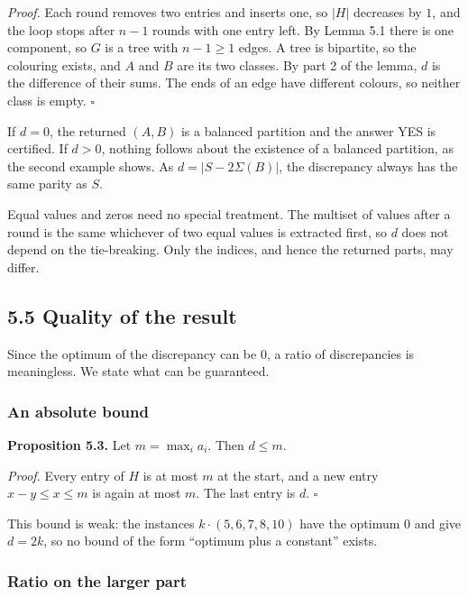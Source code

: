 \documentclass[
]{article}
\begin{document}
\emph{Proof.} Each round removes two entries and inserts one, so \(|H|\)
decreases by \(1\), and the loop stops after \(n - 1\) rounds with one
entry left. By Lemma 5.1 there is one component, so \(G\) is a tree with
\(n - 1 \ge 1\) edges. A tree is bipartite, so the colouring exists, and
\(A\) and \(B\) are its two classes. By part 2 of the lemma, \(d\) is
the difference of their sums. The ends of an edge have different
colours, so neither class is empty. \(\square\)

If \(d = 0\), the returned \((A, B)\) is a balanced partition and the
answer YES is certified. If \(d > 0\), nothing follows about the
existence of a balanced partition, as the second example shows. As
\(d = |S - 2\Sigma(B)|\), the discrepancy always has the same parity as
\(S\).

Equal values and zeros need no special treatment. The multiset of values
after a round is the same whichever of two equal values is extracted
first, so \(d\) does not depend on the tie-breaking. Only the indices,
and hence the returned parts, may differ.

\hypertarget{quality-of-the-result}{%
\subsection{5.5 Quality of the result}\label{quality-of-the-result}}

Since the optimum of the discrepancy can be \(0\), a ratio of
discrepancies is meaningless. We state what can be guaranteed.

\hypertarget{an-absolute-bound}{%
\subsubsection{An absolute bound}\label{an-absolute-bound}}

\textbf{Proposition 5.3.} Let \(m = \max_i a_i\). Then \(d \le m\).

\emph{Proof.} Every entry of \(H\) is at most \(m\) at the start, and a
new entry \(x - y \le x \le m\) is again at most \(m\). The last entry
is \(d\). \(\square\)

This bound is weak: the instances \(k \cdot (5, 6, 7, 8, 10)\) have the
optimum \(0\) and give \(d = 2k\), so no bound of the form ``optimum
plus a constant'' exists.

\hypertarget{ratio-on-the-larger-part}{%
\subsubsection{Ratio on the larger
part}\label{ratio-on-the-larger-part}}
\end{document}
